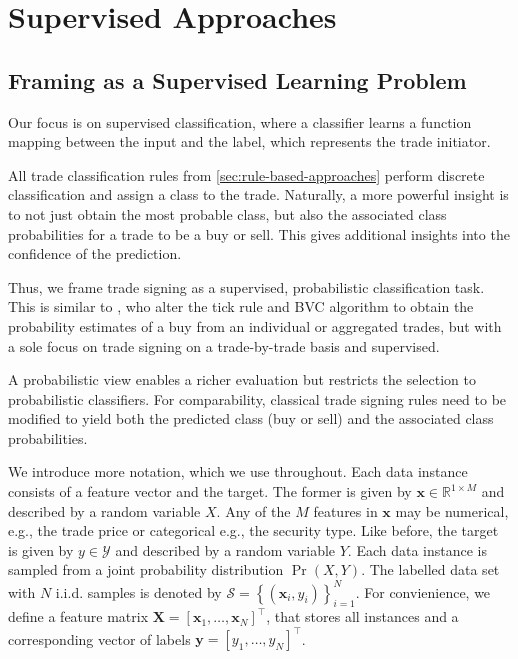 \newpage
{}
\section{Supervised Approaches}\label{sec:supervised-approaches}


\subsection{Framing as a Supervised Learning Problem}\label{sec:problem-framing}

Our focus is on supervised classification, where a classifier learns a function mapping between the input and the label, which represents the trade initiator.

All trade classification rules from \cref{sec:rule-based-approaches} perform discrete classification and assign a class to the trade. Naturally, a more powerful insight is to not just obtain the most probable class, but also the associated class probabilities for a trade to be a buy or sell. This gives additional insights into the confidence of the prediction.

Thus, we frame trade signing as a supervised, probabilistic classification task. This is similar to \textcite[][272]{easleyDiscerningInformationTrade2016}, who alter the tick rule and \gls{BVC} algorithm to obtain the probability estimates of a buy from an individual or aggregated trades, but with a sole focus on trade signing on a trade-by-trade basis and supervised.

A probabilistic view enables a richer evaluation but restricts the selection to probabilistic classifiers. For comparability, classical trade signing rules need to be modified to yield both the predicted class (buy or sell) and the associated class probabilities.

We introduce more notation, which we use throughout. Each data instance consists of a feature vector and the target. The former is given by $\mathbf{x} \in \mathbb{R}^{1 \times M}$ and described by a random variable $X$. Any of the $M$ features in $\mathbf{x}$ may be numerical, e.g., the trade price or categorical e.g., the security type. Like before, the target is given by $y \in \mathcal{Y}$ and described by a random variable $Y$. Each data instance is sampled from a joint probability distribution $\Pr(X, Y)$. The labelled data set with $N$ i.i.d. samples is denoted by $\mathcal{S} =\left\{\left(\mathbf{x}_i, y_i\right)\right\}_{i=1}^N$. For convienience, we define a feature matrix $\mathbf{X}=\left[\mathbf{x}_1,\ldots, \mathbf{x}_N\right]^{\top}$, that stores all instances and a corresponding vector of labels $\mathbf{y}=\left[y_1,\ldots, y_N \right]^{\top}$.

